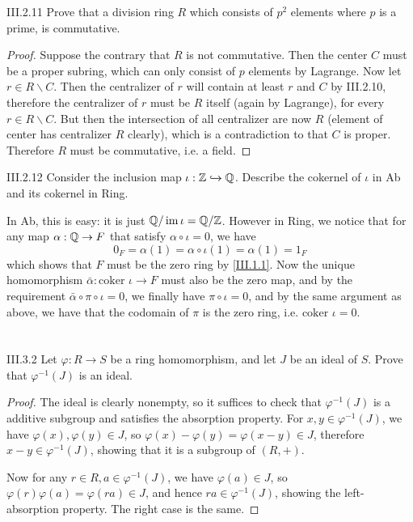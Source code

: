 \begin{problem}{III.2.11}
Prove that a division ring $R$ which consists of $p^2$ elements where $p$ is a prime, is commutative.
\end{problem}
\begin{proof}
Suppose the contrary that $R$ is not commutative. Then the center $C$ must be a proper subring, which can only consist of $p$ elements by Lagrange. Now let $r \in R \backslash C$. Then the centralizer of $r$ will contain at least $r$ and $C$ by III.2.10, therefore the centralizer of $r$ must be $R$ itself (again by Lagrange), for every $r \in R \backslash C$. But then the intersection of all centralizer are now $R$ (element of center has centralizer $R$ clearly), which is a contradiction to that $C$ is proper. Therefore $R$ must be commutative, i.e. a field.
\end{proof}

\begin{problem}{III.2.12}
Consider the inclusion map $\iota : \mathbb{Z} \xhookrightarrow{} \mathbb{Q}$. Describe the cokernel of $\iota$ in \textsf{Ab} and its cokernel in \textsf{Ring}.
\end{problem}
\begin{solution}
In \textsf{Ab}, this is easy: it is just $\mathbb{Q}/\operatorname{im} \iota = \mathbb{Q} / \mathbb{Z}$. However in \textsf{Ring}, we notice that for any map $\alpha : \mathbb{Q} \to F$ that satisfy $\alpha \circ \iota = 0$, we have
\[
0_F = \alpha (1) = \alpha \circ \iota (1) = \alpha (1) = 1_F
\]
which shows that $F$ must be the zero ring by \ref{III.1.1}. Now the unique homomorphism $\bar{\alpha} :\text{coker } \iota \to F$ must also be the zero map, and by the requirement $\bar{\alpha} \circ \pi \circ \iota = 0$, we finally have $\pi \circ \iota = 0$, and by the same argument as above, we have that the codomain of $\pi$ is the zero ring, i.e. $\text{coker } \iota = 0$.
\end{solution}

\section{}

\begin{problem}{III.3.2}
Let $\varphi:R \to S$ be a ring homomorphism, and let $J$ be an ideal of $S$. Prove that $\varphi^{-1}(J)$ is an ideal.
\end{problem}
\begin{proof}
The ideal is clearly nonempty, so it suffices to check that $\varphi^{-1}(J)$ is a additive subgroup and satisfies the absorption property. For $x, y \in \varphi^{-1}(J)$, we have $\varphi(x), \varphi(y) \in J$, so $\varphi(x)-\varphi(y) = \varphi(x-y) \in J$, therefore $x-y \in \varphi^{-1}(J)$, showing that it is a subgroup of $(R,+)$.

Now for any $r \in R, a \in \varphi^{-1}(J)$, we have $\varphi(a) \in J$, so $\varphi(r)\varphi(a) = \varphi(ra) \in J$, and hence $ra \in \varphi^{-1}(J)$, showing the left-absorption property. The right case is the same.
\end{proof}

